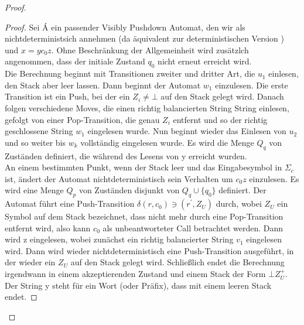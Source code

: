 \begin{proof}
\begin{proof}
Sei Á ein passender Visibly Pushdown Automat, den wir als nichtdeterministsich annehmen (da äquivalent zur deterministischen Version \cite{vpl}) und $x=yc_0z$. Ohne Beschränkung der Allgemeinheit wird zusätzlch angenommen, dass der initiale Zustand $q_0$ nicht erneut erreicht wird.\\
Die Berechnung beginnt mit Transitionen zweiter und dritter Art, die $u_1$ einlesen, den Stack aber leer lassen. Dann beginnt der Automat $w_1$ einzulesen. Die erste Transition ist ein Push, bei der ein $Z_i \neq \bot$ auf den Stack gelegt wird. Danach folgen verschiedene Moves, die einen richtig balancierten String String einlesen, gefolgt von einer Pop-Transition, die genau $Z_i$ entfernt und so der richtig geschlossene String $w_1$ eingelesen wurde. Nun beginnt wieder das Einlesen von $u_2$ und so weiter bis $w_k$ vollständig eingelesen wurde. Es wird die Menge $Q_q$ von Zuständen definiert, die während des Lesens von y erreicht wurden.\\
An einem bestimmten Punkt, wenn der Stack leer und das Eingabesymbol in $\Sigma_c$ ist, ändert der Automat nichtdeterministisch sein Verhalten um $c_0z$ einzulesen. Es wird eine Menge $Q_p$ von Zuständen disjunkt von $Q_q \cup \{q_0\}$ definiert. Der Automat führt eine Push-Transition $\delta(r, c_0) \ni (r^\prime, Z_U)$ durch, wobei $Z_U$ ein Symbol auf dem Stack bezeichnet, dass nicht mehr durch eine Pop-Transition entfernt wird, also kann $c_0$ als unbeantworteter Call betrachtet werden. Dann wird z eingelesen, wobei zunächst ein richtig balancierter String $v_1$ eingelesen wird. Dann wird wieder nichtdeterministisch eine Push-Transition ausgeführt, in der wieder ein $Z_U$ auf den Stack gelegt wird. Schließlich endet die Berechnung irgendwann in einem akzeptierenden Zustand und einem Stack der Form $\bot Z_U^+$. Der String y steht für ein Wort (oder Präfix), dass mit einem leeren Stack endet.
\end{proof}



\end{proof}
